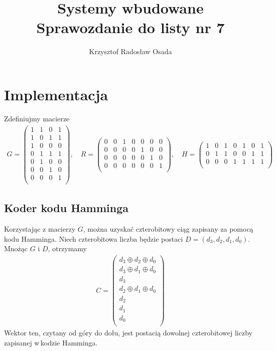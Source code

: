 \documentclass[a4paper,11pt]{article}
\author{Krzysztof Radosław Osada}
\title{\textbf{\Huge{Systemy wbudowane}}\\[3pt] Sprawozdanie do listy nr 7}
\begin{document}
  \graphicspath{{/home/krymeer/Desktop/wbud/lista7/latex/}}

  \singlespacing
  \maketitle\thispagestyle{empty}
  \onehalfspacing

  \section{Implementacja}
  Zdefiniujmy macierze
  \begin{gather*}
    G = \begin{pmatrix}
      1 & 1 & 0 & 1\\
      1 & 0 & 1 & 1\\
      1 & 0 & 0 & 0\\
      0 & 1 & 1 & 1\\
      0 & 1 & 0 & 0\\
      0 & 0 & 1 & 0\\
      0 & 0 & 0 & 1\\
    \end{pmatrix},\quad R = \begin{pmatrix}
      0 & 0 & 1 & 0 & 0 & 0 & 0 \\
      0 & 0 & 0 & 0 & 1 & 0 & 0 \\
      0 & 0 & 0 & 0 & 0 & 1 & 0 \\
      0 & 0 & 0 & 0 & 0 & 0 & 1 \\
    \end{pmatrix},\quad H = \begin{pmatrix}
      1 & 0 & 1 & 0 & 1 & 0 & 1 \\
      0 & 1 & 1 & 0 & 0 & 1 & 1 \\
      0 & 0 & 0 & 1 & 1 & 1 & 1 \\
    \end{pmatrix}
  \end{gather*}
  \subsection{Koder kodu Hamminga}
  Korzystając z macierzy $G$, można uzyskać czterobitowy ciąg zapisany za pomocą kodu Hamminga. Niech czterobitowa liczba będzie postaci $D = (d_3, d_2, d_1, d_0)$. Mnożąc $G$ i $D$, otrzymamy
  \begin{gather*} 
    C = \begin{pmatrix}
      d_3 \oplus d_2 \oplus d_0 \\
      d_3 \oplus d_1 \oplus d_0 \\
      d_3 \\
      d_2 \oplus d_1 \oplus d_0 \\
      d_2 \\
      d_1 \\
      d_0 \\
    \end{pmatrix}
  \end{gather*}
  Wektor ten, czytany od góry do dołu, jest postacią dowolnej czterobitowej liczby zapisanej w\,kodzie Hamminga.
\end{document}
